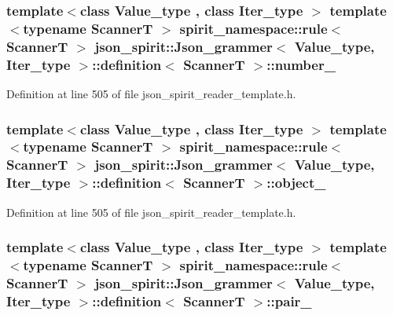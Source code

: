 \subsubsection[{number\+\_\+}]{\setlength{\rightskip}{0pt plus 5cm}template$<$class Value\+\_\+type , class Iter\+\_\+type $>$ template$<$typename Scanner\+T $>$ spirit\+\_\+namespace\+::rule$<$ Scanner\+T $>$ {\bf json\+\_\+spirit\+::\+Json\+\_\+grammer}$<$ {\bf Value\+\_\+type}, Iter\+\_\+type $>$\+::{\bf definition}$<$ Scanner\+T $>$\+::number\+\_\+}\label{classjson__spirit_1_1_json__grammer_1_1definition_a664513d2923170ddf2a27fadc5116eb5}


Definition at line 505 of file json\+\_\+spirit\+\_\+reader\+\_\+template.\+h.

\hypertarget{classjson__spirit_1_1_json__grammer_1_1definition_a4610053a045e001c3c2a949974449a0b}{}
\subsubsection[{object\+\_\+}]{\setlength{\rightskip}{0pt plus 5cm}template$<$class Value\+\_\+type , class Iter\+\_\+type $>$ template$<$typename Scanner\+T $>$ spirit\+\_\+namespace\+::rule$<$ Scanner\+T $>$ {\bf json\+\_\+spirit\+::\+Json\+\_\+grammer}$<$ {\bf Value\+\_\+type}, Iter\+\_\+type $>$\+::{\bf definition}$<$ Scanner\+T $>$\+::object\+\_\+}\label{classjson__spirit_1_1_json__grammer_1_1definition_a4610053a045e001c3c2a949974449a0b}


Definition at line 505 of file json\+\_\+spirit\+\_\+reader\+\_\+template.\+h.

\hypertarget{classjson__spirit_1_1_json__grammer_1_1definition_ad69f68497d5955a0c432760e07e32523}{}
\subsubsection[{pair\+\_\+}]{\setlength{\rightskip}{0pt plus 5cm}template$<$class Value\+\_\+type , class Iter\+\_\+type $>$ template$<$typename Scanner\+T $>$ spirit\+\_\+namespace\+::rule$<$ Scanner\+T $>$ {\bf json\+\_\+spirit\+::\+Json\+\_\+grammer}$<$ {\bf Value\+\_\+type}, Iter\+\_\+type $>$\+::{\bf definition}$<$ Scanner\+T $>$\+::pair\+\_\+}\label{classjson__spirit_1_1_json__grammer_1_1definition_ad69f68497d5955a0c432760e07e32523}


